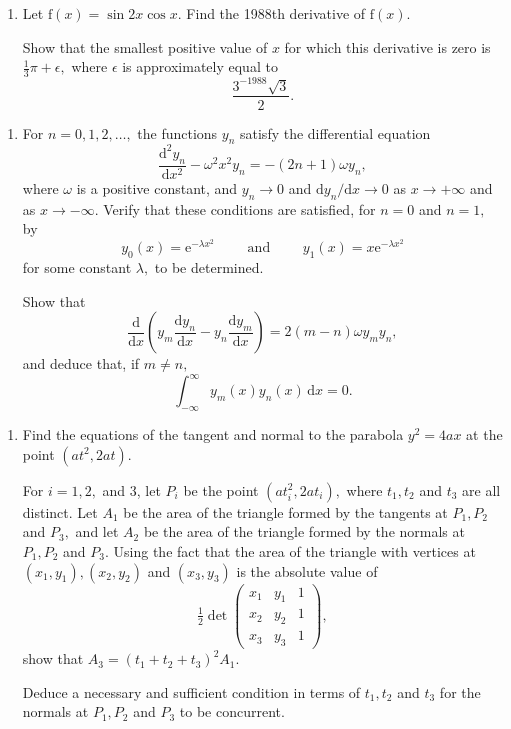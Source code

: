 \documentclass[a4, 11pt]{report}
\newlength{\qspace}
\newcounter{qnumber}
\newenvironment{question}%
 {\vspace{\qspace}
  \begin{enumerate}[\bfseries 1\quad][10]%
    \setcounter{enumi}{\value{qnumber}}%
    \item%
 }
{
  \end{enumerate}
  \filbreak
  \stepcounter{qnumber}
 }
\begin{document}
	\begin{question}
Let $\mathrm{f}(x)=\sin2x\cos x.$ Find the 1988th derivative of $\mathrm{f}(x).$


Show that the smallest positive value of $x$ for which this derivative
is zero is $\frac{1}{3}\pi+\epsilon,$ where $\epsilon$ is approximately
equal to 
\[
\frac{3^{-1988}\sqrt{3}}{2}.
\]
	 \end{question}
	 
\begin{question}
For $n=0,1,2,\ldots,$ the functions $y_{n}$ satisfy the differential
equation 
\[
\frac{\mathrm{d}^{2}y_{n}}{\mathrm{d}x^{2}}-\omega^{2}x^{2}y_{n}=-(2n+1)\omega y_{n},
\]
where $\omega$ is a positive constant, and $y_{n}\rightarrow0$ and
$\mathrm{d}y_{n}/\mathrm{d}x\rightarrow0$ as $x\rightarrow+\infty$
and as $x\rightarrow-\infty.$ Verify that these conditions are satisfied,
for $n=0$ and $n=1,$ by 
\[
y_{0}(x)=\mathrm{e}^{-\lambda x^{2}}\qquad\mbox{ and }\qquad y_{1}(x)=x\mathrm{e}^{-\lambda x^{2}}
\]
for some constant $\lambda,$ to be determined. 


Show that 
\[
\frac{\mathrm{d}}{\mathrm{d}x}\left(y_{m}\frac{\mathrm{d}y_{n}}{\mathrm{d}x}-y_{n}\frac{\mathrm{d}y_{m}}{\mathrm{d}x}\right)=2(m-n)\omega y_{m}y_{n},
\]
and deduce that, if $m\neq n,$ 
\[
\int_{-\infty}^{\infty}y_{m}(x)y_{n}(x)\,\mathrm{d}x=0.
\] 
	\end{question}
	
	\begin{question}
Find the equations of the tangent and normal to the parabola $y^{2}=4ax$
at the point $(at^{2},2at).$


For $i=1,2,$ and 3, let $P_{i}$ be the point $(at_{i}^{2},2at_{i}),$
where $t_{1},t_{2}$ and $t_{3}$ are all distinct. Let $A_{1}$ be
the area of the triangle formed by the tangents at $P_{1},P_{2}$
and $P_{3},$ and let $A_{2}$ be the area of the triangle formed
by the normals at $P_{1},P_{2}$ and $P_{3}.$ Using the fact that
the area of the triangle with vertices at $(x_{1},y_{1}),(x_{2},y_{2})$
and $(x_{3},y_{3})$ is the absolute value of 
\[
\tfrac{1}{2}\det\begin{pmatrix}x_{1} & y_{1} & 1\\
x_{2} & y_{2} & 1\\
x_{3} & y_{3} & 1
\end{pmatrix},
\]
show that $A_{3}=(t_{1}+t_{2}+t_{3})^{2}A_{1}.$


Deduce a necessary and sufficient condition in terms of $t_{1},t_{2}$
and $t_{3}$ for the normals at $P_{1},P_{2}$ and $P_{3}$ to be
concurrent.
		
		\end{question}
		
\end{document}
